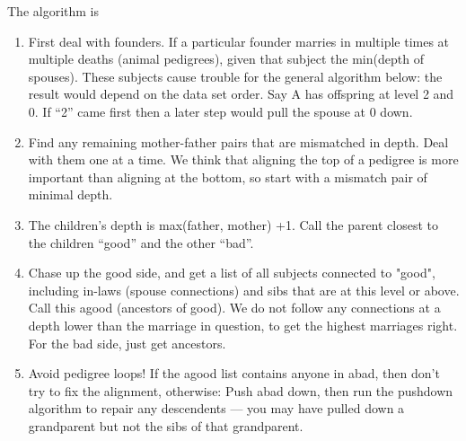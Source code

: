 \documentclass{article}
\begin{document}
The algorithm is
\begin{enumerate}
  \item First deal with founders.  If a particular founder marries in
    multiple times at multiple deaths (animal pedigrees), given that
    subject the min(depth of spouses).  These subjects cause trouble
    for the general algorithm below: the result would depend on the
    data set order.  Say A has offspring at level 2 and 0.  If ``2'' came
    first then a later step would pull the spouse at 0 down.
  \item Find any remaining mother-father pairs that are mismatched in depth.
    Deal with them one at a time.
    We think that aligning the top of a pedigree is more important
    than aligning at the bottom, so start with a mismatch pair of minimal
    depth.
  \item The children's depth is max(father, mother) +1.  Call the
    parent closest to the children ``good'' and the other ``bad''.
  \item  Chase up the good side, and get a list of all subjects connected
    to "good", including in-laws (spouse connections) and sibs that are
    at this level or above.  Call this agood (ancestors of good).
    We do not follow any connections at a depth lower than the 
    marriage in question, to get the highest marriages right.
    For the bad side, just get ancestors.
  \item Avoid pedigree loops!  If the agood list contains anyone in abad,
    then don't try to fix the alignment, otherwise:
    Push abad down, then run the pushdown algorithm to
    repair any descendents --- you may have pulled down a grandparent but
    not the sibs of that grandparent.
\end{enumerate}
    
\end{document}
